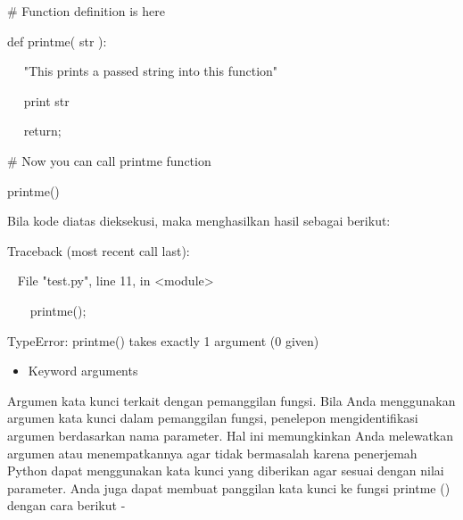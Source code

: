 \vspace{12pt}
\noindent 
 \hspace*{0.5in}  $  \#  $ Function definition is here \par
\noindent 
 \hspace*{0.5in} def printme( str ): \par
\noindent 
~~  \hspace*{0.5in}  \hspace*{0.5in} "This prints a passed string into this function" \par
\noindent 
~~  \hspace*{0.5in} print str \par
\noindent 
~~  \hspace*{0.5in} return; \par
\vspace{12pt}
\noindent 
 \hspace*{0.5in}  $  \#  $ Now you can call printme function \par
\noindent 
 \hspace*{0.5in} printme() \par
 \vspace{\baselineskip}
\noindent 
Bila kode diatas dieksekusi, maka menghasilkan hasil sebagai berikut: \par
\noindent 
 \hspace*{0.5in} Traceback (most recent call last): \par
\noindent 
 \hspace*{0.5in} ~ File "test.py", line 11, in <module> \par
\noindent 
 \hspace*{0.5in} ~~~ printme(); \par
\noindent 
 \hspace*{0.5in} TypeError: printme() takes exactly 1 argument (0 given) \par
\vspace{12pt}
\noindent 
\begin{itemize}
	\item Keyword arguments 
\end{itemize}
\noindent 
Argumen kata kunci terkait dengan pemanggilan fungsi. Bila Anda menggunakan argumen kata kunci dalam pemanggilan fungsi, penelepon mengidentifikasi argumen berdasarkan nama parameter. Hal ini memungkinkan Anda melewatkan argumen atau menempatkannya agar tidak bermasalah karena penerjemah Python dapat menggunakan kata kunci yang diberikan agar sesuai dengan nilai parameter. Anda juga dapat membuat panggilan kata kunci ke fungsi printme () dengan cara berikut - \par
